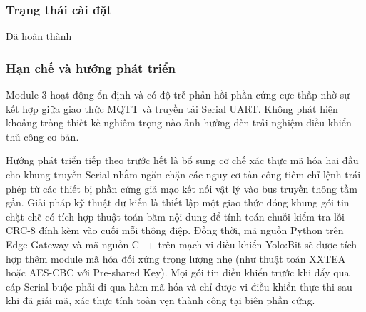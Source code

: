 




\subsubsection{Trạng thái cài đặt}
Đã hoàn thành

\subsubsection{Hạn chế và hướng phát triển}
Module 3 hoạt động ổn định và có độ trễ phản hồi phần cứng cực thấp nhờ sự kết hợp giữa giao thức MQTT và truyền tải Serial UART. Không phát hiện khoảng trống thiết kế nghiêm trọng nào ảnh hưởng đến trải nghiệm điều khiển thủ công cơ bản. 

Hướng phát triển tiếp theo trước hết là bổ sung cơ chế xác thực mã hóa hai đầu cho khung truyền Serial nhằm ngăn chặn các nguy cơ tấn công tiêm chỉ lệnh trái phép từ các thiết bị phần cứng giả mạo kết nối vật lý vào bus truyền thông tầm gần. Giải pháp kỹ thuật dự kiến là thiết lập một giao thức đóng khung gói tin chặt chẽ có tích hợp thuật toán băm nội dung để tính toán chuỗi kiểm tra lỗi CRC-8 đính kèm vào cuối mỗi thông điệp. Đồng thời, mã nguồn Python trên Edge Gateway và mã nguồn C++ trên mạch vi điều khiển Yolo:Bit sẽ được tích hợp thêm module mã hóa đối xứng trọng lượng nhẹ (như thuật toán XXTEA hoặc AES-CBC với Pre-shared Key). Mọi gói tin điều khiển trước khi đẩy qua cáp Serial buộc phải đi qua hàm mã hóa và chỉ được vi điều khiển thực thi sau khi đã giải mã, xác thực tính toàn vẹn thành công tại biên phần cứng.

